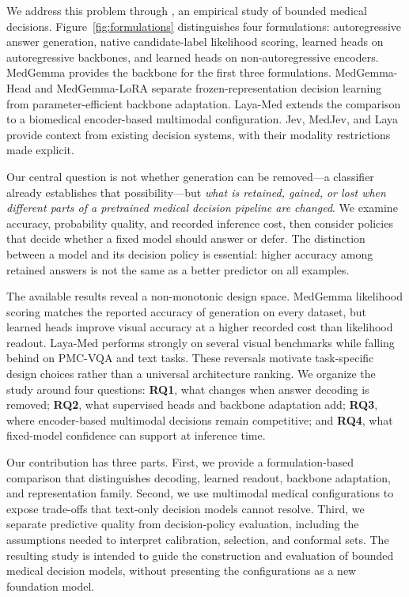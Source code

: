 We address this problem through \sysone, an empirical study of bounded medical decisions. Figure~\ref{fig:formulations} distinguishes four formulations: autoregressive answer generation, native candidate-label likelihood scoring, learned heads on autoregressive backbones, and learned heads on non-autoregressive encoders. MedGemma provides the backbone for the first three formulations. MedGemma-Head and MedGemma-LoRA separate frozen-representation decision learning from parameter-efficient backbone adaptation. Laya-Med extends the comparison to a biomedical encoder-based multimodal configuration. Jev, MedJev, and Laya provide context from existing decision systems, with their modality restrictions made explicit.

Our central question is not whether generation can be removed---a classifier already establishes that possibility---but \emph{what is retained, gained, or lost when different parts of a pretrained medical decision pipeline are changed}. We examine accuracy, probability quality, and recorded inference cost, then consider policies that decide whether a fixed model should answer or defer. The distinction between a model and its decision policy is essential: higher accuracy among retained answers is not the same as a better predictor on all examples.

The available results reveal a non-monotonic design space. MedGemma likelihood scoring matches the reported accuracy of generation on every dataset, but learned heads improve visual accuracy at a higher recorded cost than likelihood readout. Laya-Med performs strongly on several visual benchmarks while falling behind on PMC-VQA and text tasks. These reversals motivate task-specific design choices rather than a universal architecture ranking. We organize the study around four questions: \textbf{RQ1}, what changes when answer decoding is removed; \textbf{RQ2}, what supervised heads and backbone adaptation add; \textbf{RQ3}, where encoder-based multimodal decisions remain competitive; and \textbf{RQ4}, what fixed-model confidence can support at inference time.

Our contribution has three parts. First, we provide a formulation-based comparison that distinguishes decoding, learned readout, backbone adaptation, and representation family. Second, we use multimodal medical configurations to expose trade-offs that text-only decision models cannot resolve. Third, we separate predictive quality from decision-policy evaluation, including the assumptions needed to interpret calibration, selection, and conformal sets. The resulting study is intended to guide the construction and evaluation of bounded medical decision models, without presenting the configurations as a new foundation model.

